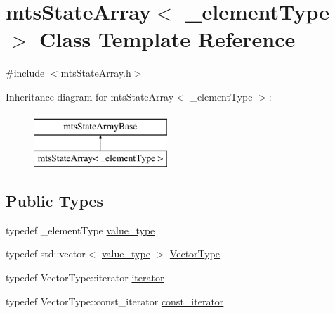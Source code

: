 \hypertarget{classmts_state_array}{\section{mts\-State\-Array$<$ \-\_\-element\-Type $>$ Class Template Reference}
\label{classmts_state_array}
}


{\ttfamily \#include $<$mts\-State\-Array.\-h$>$}

Inheritance diagram for mts\-State\-Array$<$ \-\_\-element\-Type $>$\-:\begin{figure}[H]
\begin{center}
\leavevmode
\includegraphics[height=2.000000cm]{d8/dea/classmts_state_array}
\end{center}
\end{figure}
\subsection*{Public Types}
\begin{DoxyCompactItemize}
\item 
typedef \-\_\-element\-Type \hyperlink{classmts_state_array_a1d78f1e353af8687797d4a359b694ee1}{value\-\_\-type}
\item 
typedef std\-::vector$<$ \hyperlink{classmts_state_array_a1d78f1e353af8687797d4a359b694ee1}{value\-\_\-type} $>$ \hyperlink{classmts_state_array_a4d8a41652bc6d14fb99d28c71286058a}{Vector\-Type}
\item 
typedef Vector\-Type\-::iterator \hyperlink{classmts_state_array_ab2a822354bffa12e2d954b4a11847e98}{iterator}
\item 
typedef Vector\-Type\-::const\-\_\-iterator \hyperlink{classmts_state_array_a40a7371d5f45f10e9cd9308cccef0168}{const\-\_\-iterator}
\end{DoxyCompactItemize}
